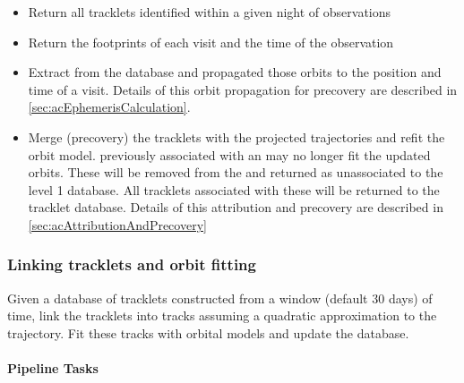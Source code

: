 \begin{itemize}
\item Return all tracklets identified within a given night of observations
\item Return the footprints of each visit and the time of the observation
\item Extract \SSObjects from the \SSObject database and propagated those orbits to the position and time of a visit. Details of this orbit propagation for precovery are described in \ref{sec:acEphemerisCalculation}.
\item Merge (precovery) the tracklets with the projected \SSObject trajectories and refit  the \SSObject orbit model. \DIASources previously associated with an \SSObject may no longer fit the updated \SSObject orbits. These \DIASources will be removed from the \SSObject and returned as unassociated \DIAObjects to the level 1 database. All tracklets associated with these \DIAObjects will be  returned to the tracklet database. Details of this attribution and precovery are described in \ref{sec:acAttributionAndPrecovery}
\end{itemize}

\subsubsection{Linking tracklets and orbit fitting}

Given a database of tracklets constructed from a window (default 30 days) of time, link the tracklets into tracks assuming a quadratic approximation to the trajectory. Fit these tracks with orbital models and update the \SSObject database.

\paragraph{Pipeline Tasks}

